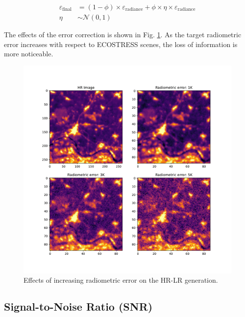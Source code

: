         \begin{equation}
        \begin{aligned}
            \varepsilon_{\text{final}} &= (1 - \phi) \times \varepsilon_{\text{radiance}} + \phi \times \eta \times \varepsilon_{\text{radiance}} \\
            \eta & \sim \mathcal{N} (0,1)
        \end{aligned}
        \end{equation}    

        The effects of the error correction is shown in Fig. \ref{fig:4-radiometric_noise_example}. As the target radiometric error increases with respect to ECOSTRESS scenes, the loss of information is more noticeable.


        \begin{figure}[h!]
            \centering
            \includegraphics[width=\textwidth]{Includes/4-radiometric_noise_example.pdf}
            \caption{Effects of increasing radiometric error on the HR-LR generation.}
            \label{fig:4-radiometric_noise_example}
        \end{figure}
        
    

    \subsection{Signal-to-Noise Ratio (SNR)}


